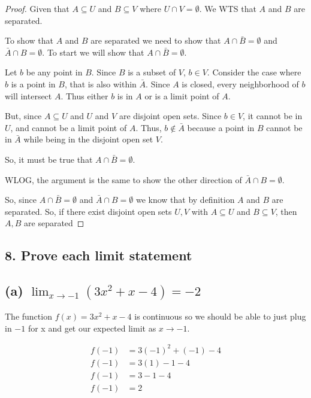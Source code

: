 \documentclass{article}
\begin{document}
\begin{proof}

Given that $A \subseteq U$ and $B \subseteq V$ where $U \cap V = \emptyset$. We WTS that $A$ and $B$ are separated.

To show that $A$ and $B$ are separated we need to show that $A \cap \bar{B} = \emptyset$ and $\bar{A} \cap B = \emptyset$. To start we will show that 
$A \cap \bar{B} = \emptyset$.

Let $b$ be any point in $B$. Since $B$ is a subset of $V$, $b \in V$. Consider the case where $b$ is a point in $B$, that is also within $\bar{A}$. Since $A$ 
is closed, every neighborhood of $b$ will intersect $A$. Thus either $b$ is in $A$ or is a limit point of $A$.

But, since $A \subseteq U$ and $U$ and $V$ are disjoint open sets. Since $b \in V$, it cannot be in $U$, and cannot be a limit point of $A$. Thus, $b \notin \bar{A}$ because a point in $B$ 
cannot be in $\bar{A}$ while being in the disjoint open set $V$.

So, it must be true that $A \cap \bar{B} = \emptyset$.

WLOG, the argument is the same to show the other direction of $\bar{A} \cap B = \emptyset$.

So, since $A \cap \bar{B} = \emptyset$ and $\bar{A} \cap B = \emptyset$ we know that by definition $A$ and $B$ are separated. So, if there exist disjoint open sets $U, V$ with $A \subseteq U$ and $B \subseteq V$, then $A,B$ are separated

\end{proof}

\subsection*{8. Prove each limit statement}

\subsection*{(a) $\lim_{x \to -1} \left( 3x^2 + x - 4 \right) = -2$}

The function $f(x) = 3x^2+x-4$ is continuous so we should be able to just plug in $-1$ for x and get our expected limit as $x \rightarrow -1$.

\begin{align*}
    f(-1) &= 3(-1)^2 + (-1) - 4 \\
    f(-1) &= 3(1) - 1 - 4 \\
    f(-1) &= 3 - 1 - 4 \\
    f(-1) &= 2
\end{align*}
    
\end{document}
